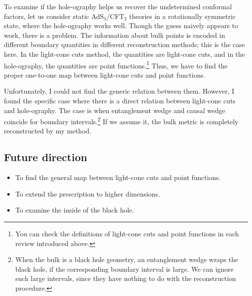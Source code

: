 \documentclass[12pt]{article}
\begin{document}
To examine if the hole-ography helps us recover the undetermined conformal factors,
let us consider static AdS$_3$/CFT$_2$ theories in a rotationally symmetric state,
where the hole-ography works well.
Though the guess naively appears to work, there is a problem.
The information about bulk points is encoded in different boundary quantities in different reconstruction methods;
this is the case here.
In the light-cone cuts method, the quantities are light-cone cuts, and in the hole-ography,
the quantities are point functions.\footnote{
You can check the definitions of light-cone cuts and point functions in each review introduced above.
}
Thus, we have to find the proper one-to-one map between light-cone cuts and point functions.

Unfortunately, I could not find the generic relation between them.
However, I found the specific case where there is a direct relation between light-cone cuts and hole-ography.
The case is when entanglement wedge and causal wedge coincide for boundary intervals.\footnote{
When the bulk is a black hole geometry,
an entanglement wedge wraps the black hole, if the corresponding boundary interval is large.
We can ignore such large intervals, since they have nothing to do with the reconstruction procedure.
}
If we assume it, the bulk metric is completely reconstructed by my method.


\subsection*{Future direction}
\begin{itemize}
	\item To find the general map between light-cone cuts and point functions.
	\item To extend the prescription to higher dimensions.
	\item To examine the inside of the black hole.
\end{itemize}



 

\end{document}
